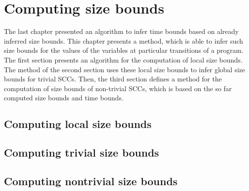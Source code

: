 \section{Computing size bounds}

The last chapter presented an algorithm to infer time bounds based on already inferred size bounds.
This chapter presents a method, which is able to infer such size bounds for the values of the variables at particular transitions of a program.
The first section presents an algorithm for the computation of local size bounds.
The method of the second section uses these local size bounds to infer global size bounds for trivial SCCs.
Then, the third section defines a method for the computation of size bounds of non-trivial SCCs, which is based on the so far computed size bounds and time bounds.

\subsection{Computing local size bounds}



\subsection{Computing trivial size bounds}



\subsection{Computing nontrivial size bounds}


